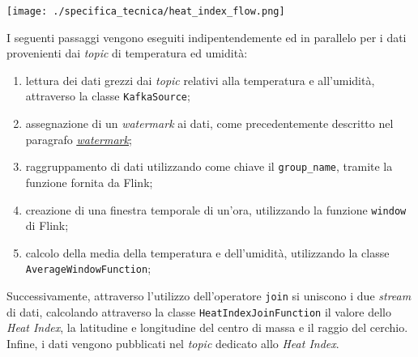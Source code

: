 \begin{center}
	\texttt{[image: ./specifica\_tecnica/heat\_index\_flow.png]}
\end{center}
I seguenti passaggi vengono eseguiti indipentendemente ed in parallelo per i dati provenienti dai \textit{topic} di temperatura ed umidità:
\begin{enumerate}
	\item lettura dei dati grezzi dai \textit{topic} relativi alla temperatura e all'umidità, attraverso la classe \texttt{KafkaSource};
	\item assegnazione di un \textit{watermark} ai dati, come precedentemente descritto nel paragrafo \hyperref[watermark]{\underline{\textit{watermark}}};
	\item raggruppamento di dati utilizzando come chiave il \texttt{group\_name}, tramite la funzione \texttt{} fornita da Flink;
	\item creazione di una finestra temporale di un'ora, utilizzando la funzione \texttt{window} di Flink;
	\item calcolo della media della temperatura e dell'umidità, utilizzando la classe \\\texttt{AverageWindowFunction};
\end{enumerate}
Successivamente, attraverso l'utilizzo dell'operatore \texttt{join} si uniscono i due \textit{stream} di dati, calcolando
attraverso la classe \texttt{HeatIndexJoinFunction} il valore dello \textit{Heat Index}, la latitudine e longitudine del centro di massa e il raggio del cerchio.
Infine, i dati vengono pubblicati nel \textit{topic} dedicato allo \textit{Heat Index}.


